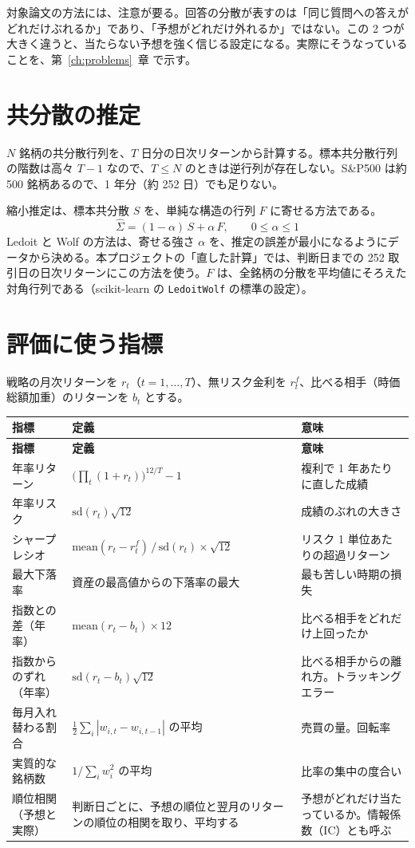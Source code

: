 \documentclass[xelatex,ja=standard,jafont=hiragino-pron,a4paper,10pt]{bxjsreport}
\newcommand{\SP}{S\&P500}
\newcommand{\code}[1]{\texttt{#1}}
\newcommand{\chapref}[1]{第~\ref{#1}~章}
\begin{document}
対象論文の方法には、注意が要る。回答の分散が表すのは「同じ質問への答えがどれだけぶれるか」であり、「予想がどれだけ外れるか」ではない。この 2 つが大きく違うと、当たらない予想を強く信じる設定になる。実際にそうなっていることを、\chapref{ch:problems} で示す。

\section{共分散の推定}

$N$ 銘柄の共分散行列を、$T$ 日分の日次リターンから計算する。標本共分散行列の階数は高々 $T-1$ なので、$T \le N$ のときは逆行列が存在しない。\SP{} は約 500 銘柄あるので、1 年分（約 252 日）でも足りない。

縮小推定は、標本共分散 $S$ を、単純な構造の行列 $F$ に寄せる方法である。
\begin{equation}
\hat{\Sigma} = (1-\alpha)\, S + \alpha\, F,\qquad 0 \le \alpha \le 1
\end{equation}
Ledoit と Wolf の方法は、寄せる強さ $\alpha$ を、推定の誤差が最小になるようにデータから決める。本プロジェクトの「直した計算」では、判断日までの 252 取引日の日次リターンにこの方法を使う。$F$ は、全銘柄の分散を平均値にそろえた対角行列である（scikit-learn の \code{LedoitWolf} の標準の設定）。

\section{評価に使う指標}

戦略の月次リターンを $r_t$（$t=1,\dots,T$）、無リスク金利を $r^f_t$、比べる相手（時価総額加重）のリターンを $b_t$ とする。

\begin{longtable}{p{3.60cm}p{5.60cm}p{5.20cm}}
\toprule
\textbf{指標} & \textbf{定義} & \textbf{意味} \\
\midrule
\endfirsthead
\toprule
\textbf{指標} & \textbf{定義} & \textbf{意味} \\
\midrule
\endhead
\bottomrule
\endfoot
年率リターン & $\bigl(\prod_t (1+r_t)\bigr)^{12/T} - 1$ & 複利で 1 年あたりに直した成績 \\
年率リスク & $\mathrm{sd}(r_t)\sqrt{12}$ & 成績のぶれの大きさ \\
シャープレシオ & $\mathrm{mean}(r_t - r^f_t)\,/\,\mathrm{sd}(r_t)\times\sqrt{12}$ & リスク 1 単位あたりの超過リターン \\
最大下落率 & 資産の最高値からの下落率の最大 & 最も苦しい時期の損失 \\
指数との差（年率） & $\mathrm{mean}(r_t - b_t)\times 12$ & 比べる相手をどれだけ上回ったか \\
指数からのずれ（年率） & $\mathrm{sd}(r_t - b_t)\sqrt{12}$ & 比べる相手からの離れ方。トラッキングエラー \\
毎月入れ替わる割合 & $\frac{1}{2}\sum_i |w_{i,t} - w_{i,t-1}|$ の平均 & 売買の量。回転率 \\
実質的な銘柄数 & $1/\sum_i w_i^2$ の平均 & 比率の集中の度合い \\
順位相関（予想と実際） & 判断日ごとに、予想の順位と翌月のリターンの順位の相関を取り、平均する & 予想がどれだけ当たっているか。情報係数（IC）とも呼ぶ \\
\end{longtable}
\end{document}
